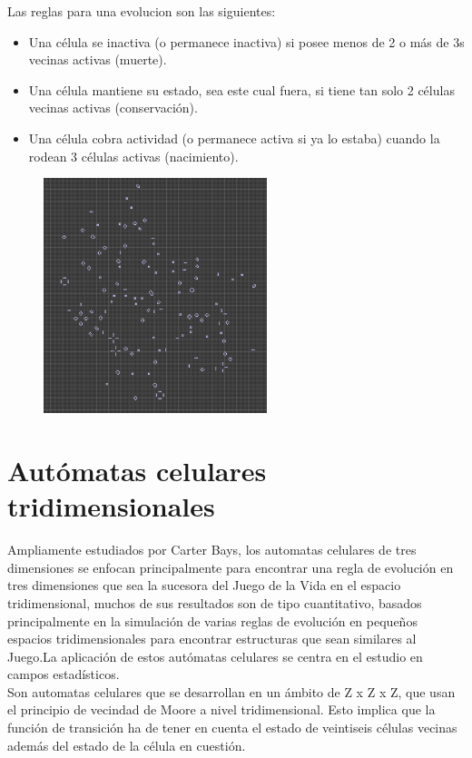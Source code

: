 \documentclass[a4paper,12pt]{article}
\begin{document}
Las reglas para una evolucion son las siguientes:
\begin{itemize}
\item Una célula se inactiva (o permanece inactiva) si posee menos de 2 o más de 3s vecinas activas (muerte).
\item Una célula mantiene su estado, sea este cual fuera, si tiene tan solo 2 células vecinas activas (conservación).
\item Una célula cobra actividad (o permanece activa si ya lo estaba) cuando la rodean 3 células activas (nacimiento).
\end{itemize}

\begin{figure}[htp]
\centering
\includegraphics[width=6.5cm]{8.jpg}
\label{fig:lion}
\end{figure}

\clearpage

\section{Autómatas celulares tridimensionales}

Ampliamente estudiados por Carter Bays, los automatas celulares de tres dimensiones se enfocan principalmente para encontrar una regla de evolución en tres dimensiones que sea la sucesora del Juego de la Vida en el espacio tridimensional, muchos de sus resultados son de tipo cuantitativo, basados principalmente en la simulación de varias reglas de evolución en pequeños espacios tridimensionales para encontrar estructuras que sean similares al Juego.La aplicación de estos autómatas celulares se centra en el estudio en campos estadísticos.\\

Son automatas celulares que se desarrollan en un ámbito de Z x Z x Z, que usan el principio de vecindad de Moore a nivel tridimensional. Esto implica que la función de transición ha de tener en cuenta el estado de veintiseis células vecinas además del estado de la célula en cuestión.\\
\end{document}
